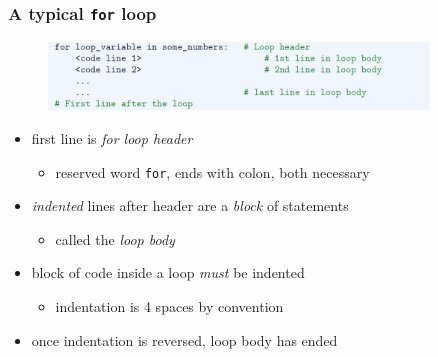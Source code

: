 \documentclass[english,14pt]{beamer}
\newcommand\red[1]{{\color{red} #1}}
\begin{document}
\begin{frame}[fragile]

\frametitle{A typical \texttt{for} loop}

\begin{figure}[ht]
	\centering
	\includegraphics[width=0.9\textwidth]{figures/LLp60c}
\end{figure}
	\vspace*{-3mm}
\begin{itemize}
	\item first line is \red{\emph{for loop header}}
	\begin{itemize}
		\item reserved word \texttt{for}, ends with colon, both necessary
	\end{itemize}
	\item \red{\emph{indented}} lines after header are a \red{\emph{block}} of statements%
	\begin{itemize}
		\item called the \red{\emph{loop body}}
	\end{itemize}
	\item block of code inside a loop \emph{must} be indented 
	\begin{itemize}
		\item indentation is 4 spaces by convention
	\end{itemize}
	\item once indentation is reversed, loop body has ended
\end{itemize}

\end{frame}

\end{document}
